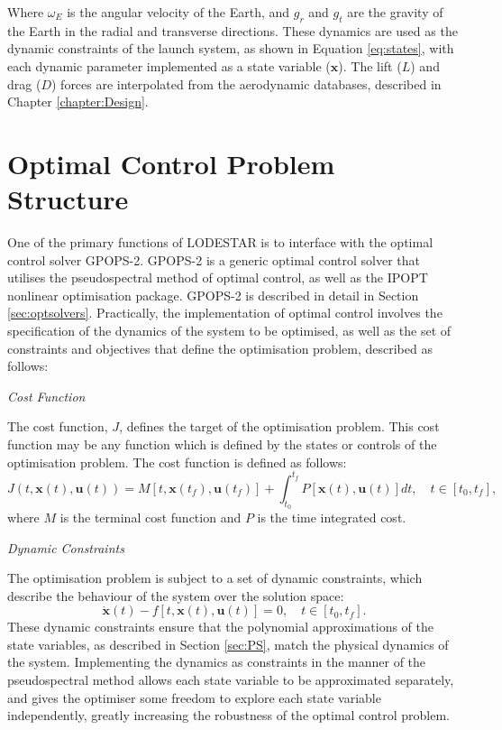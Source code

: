 Where $\omega_E$ is the angular velocity of the Earth, and $g_r$ and $g_t$ are the gravity of the Earth in the radial and transverse directions. These dynamics are used as the dynamic constraints of the launch system, as shown in Equation \ref{eq:states}, with each dynamic parameter implemented as a state variable ($\mathbf{x}$). The lift ($L$) and drag ($D$) forces are interpolated from the aerodynamic databases, described in Chapter \ref{chapter:Design}.

\section{Optimal Control Problem Structure}\label{sec:optstruct}

One of the primary functions of LODESTAR is to interface with the optimal control solver GPOPS-2. GPOPS-2 is a generic optimal control solver that utilises the pseudospectral method of optimal control, as well as the IPOPT nonlinear optimisation package. GPOPS-2 is described in detail in Section \ref{sec:optsolvers}. Practically, the implementation of optimal control involves the specification of the dynamics of the system to be optimised, as well as the set of constraints and objectives that define the optimisation problem, described as follows:

\noindent \textit{Cost Function}

\noindent The cost function, $J$, defines the target of the optimisation problem. 
This cost function may be any function which is defined by the states or controls of the optimisation problem. The cost function is defined as follows:
\begin{equation} \label{eq:cost}
J(t,\textbf{x}(t),\textbf{u}(t)) = M[t,\textbf{x}(t_f),\textbf{u}(t_f)] +   \int_{t_0}^{t_f} P[\textbf{x}(t),\textbf{u}(t)] dt, \quad t \in [t_0,t_f],
\end{equation}
where $M$ is the terminal cost function and $P$ is the time integrated cost. 

\noindent \textit{Dynamic Constraints}

\noindent 
The optimisation problem is subject to a set of dynamic constraints, which describe the behaviour of the system over the solution space:
\begin{equation} \label{eq:state}
\dot{\textbf{x}}(t) - f[t,\textbf{x}(t),\textbf{u}(t)] = 0, \quad t \in [t_0,t_f].
\end{equation}
These dynamic constraints ensure that the polynomial approximations of the state variables, as described in Section \ref{sec:PS}, match the physical dynamics of the system. Implementing the dynamics as constraints in the manner of the pseudospectral method allows each state variable to be approximated separately, and gives the optimiser some freedom to explore each state variable independently, greatly increasing the robustness of the optimal control problem.




